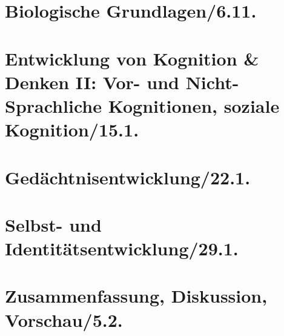 \documentclass[a4paper]{scrartcl}
\begin{document}
\section{Biologische Grundlagen/6.11.}





\section{Entwicklung von Kognition \& Denken II: Vor- und Nicht-Sprachliche Kognitionen, soziale Kognition/15.1.}
\section{Gedächtnisentwicklung/22.1.}
\section{Selbst- und Identitätsentwicklung/29.1.}
\section{Zusammenfassung, Diskussion, Vorschau/5.2.}


\end{document}
